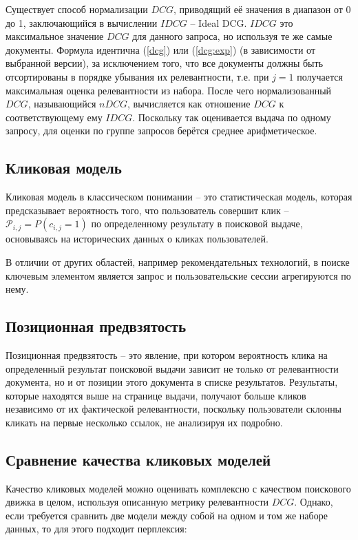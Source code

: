 \documentclass[diploma]{nanolab2015}
\begin{document}
Существует способ нормализации $DCG$, приводящий её значения в диапазон от 0 до 1, заключающийся в вычислении $IDCG$ -- Ideal DCG. $IDCG$ это максимальное значение $DCG$ для данного запроса, но используя те же самые документы. Формула идентична (\ref{dcg}) или (\ref{dcg:exp}) (в зависимости от выбранной версии), за исключением того, что все документы должны быть отсортированы в порядке убывания их релевантности, т.е. при $j=1$ получается максимальная оценка релевантности из набора.
После чего нормализованный $DCG$, называющийся $nDCG$, вычисляется как отношение $DCG$ к соответствующему ему $IDCG$. Поскольку так оценивается выдача по одному запросу, для оценки по группе запросов берётся среднее арифметическое.

\subsection{Кликовая модель}
Кликовая модель в классическом понимании -- это статистическая модель, которая предсказывает вероятность того, что пользователь совершит клик -- $\mathcal{P}_{i,j} = P(c_{i,j} = 1)$ по определенному результату в поисковой выдаче, основываясь на исторических данных о кликах пользователей.

В отличии от других областей, например рекомендательных технологий, в поиске ключевым элементом является запрос и пользовательские сессии агрегируются по нему.

\subsection{Позиционная предвзятость}
Позиционная предвзятость -- это явление, при котором вероятность клика на определенный результат поисковой выдачи зависит не только от релевантности документа, но и от позиции этого документа в списке результатов. Результаты, которые находятся выше на странице выдачи, получают больше кликов независимо от их фактической релевантности, поскольку пользователи склонны кликать на первые несколько ссылок, не анализируя их подробно.


\subsection{Сравнение качества кликовых моделей}
Качество кликовых моделей можно оценивать комплексно с качеством поискового движка в целом, используя описанную метрику релевантности $DCG$. Однако, если требуется сравнить две модели между собой на одном и том же наборе данных, то для этого подходит перплексия:
\end{document}
